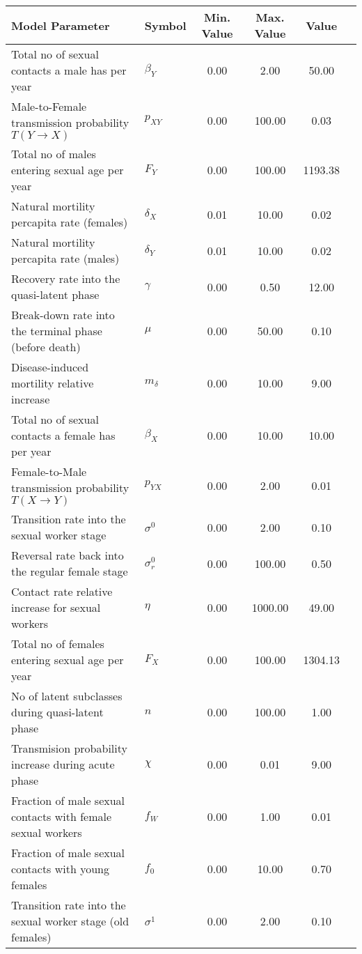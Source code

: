 \begin{table}
\centering
\begin{tabular}{p{5cm}lcccc}
{\bf Model Parameter} & {\bf Symbol} & {\bf Min. Value} & {\bf Max. Value} & {\bf Value}\\
\hline\hline
Total no of sexual contacts a male has per year & $\beta_Y$ & 0.00 & 2.00 & 50.00\\
Male-to-Female transmission probability $T(Y\rightarrow X)$ & $p_{XY}$ & 0.00 & 100.00 & 0.03\\
Total no of males entering sexual age per year & $F_Y$ & 0.00 & 100.00 & 1193.38\\
Natural mortility percapita rate (females) & $\delta_X$ & 0.01 & 10.00 & 0.02\\
Natural mortility percapita rate (males) & $\delta_Y$ & 0.01 & 10.00 & 0.02\\
Recovery rate into the quasi-latent phase & $\gamma$ & 0.00 & 0.50 & 12.00\\
Break-down rate into the terminal phase (before death) & $\mu$ & 0.00 & 50.00 & 0.10\\
Disease-induced mortility relative increase & $m_{\delta}$ & 0.00 & 10.00 & 9.00\\
Total no of sexual contacts a female has per year & $\beta_X$ & 0.00 & 10.00 & 10.00\\
Female-to-Male transmission probability $T(X\rightarrow Y)$ & $p_{YX}$ & 0.00 & 2.00 & 0.01\\
Transition rate into the sexual worker stage & $\sigma^0$ & 0.00 & 2.00 & 0.10\\
Reversal rate back into the regular female stage & $\sigma^0_r$ & 0.00 & 100.00 & 0.50\\
Contact rate relative increase for sexual workers & $\eta$ & 0.00 & 1000.00 & 49.00\\
Total no of females entering sexual age per year & $F_X$ & 0.00 & 100.00 & 1304.13\\
No of latent subclasses during quasi-latent phase & $n$ & 0.00 & 100.00 & 1.00\\
Transmision probability increase during acute phase & $\chi$ & 0.00 & 0.01 & 9.00\\
Fraction of male sexual contacts with female sexual workers & $f_W$ & 0.00 & 1.00 & 0.01\\
Fraction of male sexual contacts with young females & $f_0$ & 0.00 & 10.00 & 0.70\\
Transition rate into the sexual worker stage (old females) & $\sigma^1$ & 0.00 & 2.00 & 0.10\\

\end{tabular}
\end{table}
